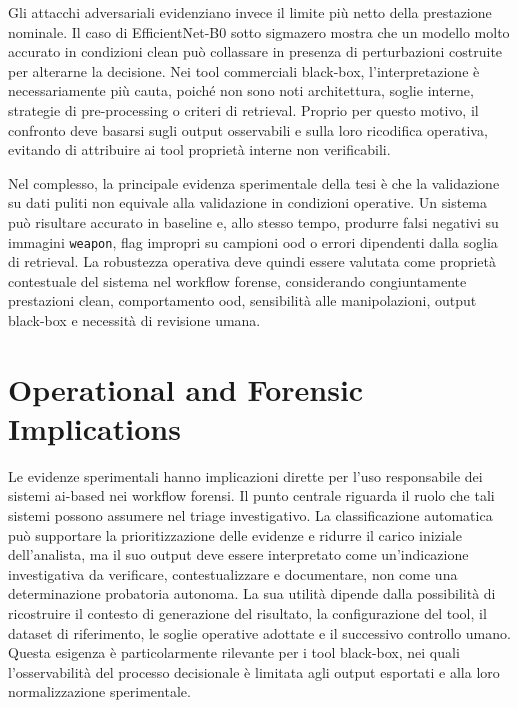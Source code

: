 Gli attacchi adversariali evidenziano invece il limite più netto della
prestazione nominale. Il caso di EfficientNet-B0 sotto \gls{sigmazero} mostra
che un modello molto accurato in condizioni clean può collassare in presenza di
perturbazioni costruite per alterarne la decisione. Nei tool commerciali
black-box, l'interpretazione è necessariamente più cauta, poiché non sono noti
architettura, soglie interne, strategie di pre-processing o criteri di retrieval.
Proprio per questo motivo, il confronto deve basarsi sugli output osservabili e
sulla loro ricodifica operativa, evitando di attribuire ai tool proprietà interne
non verificabili.

Nel complesso, la principale evidenza sperimentale della tesi è che la
validazione su dati puliti non equivale alla validazione in condizioni operative.
Un sistema può risultare accurato in baseline e, allo stesso tempo, produrre
falsi negativi su immagini \texttt{weapon}, flag impropri su campioni \gls{ood}
o errori dipendenti dalla soglia di retrieval. La robustezza operativa deve
quindi essere valutata come proprietà contestuale del sistema nel workflow
forense, considerando congiuntamente prestazioni clean, comportamento
\gls{ood}, sensibilità alle manipolazioni, output black-box e necessità di
revisione umana.



\section{Operational and Forensic Implications}
\label{sec:conclusions-operational-implications}

Le evidenze sperimentali hanno implicazioni dirette per l'uso responsabile dei
sistemi \gls{ai}-based nei workflow forensi. Il punto centrale riguarda il ruolo
che tali sistemi possono assumere nel triage investigativo. La classificazione
automatica può supportare la prioritizzazione delle evidenze e ridurre il carico
iniziale dell'analista, ma il suo output deve essere interpretato come
un'indicazione investigativa da verificare, contestualizzare e documentare, non
come una determinazione probatoria autonoma. La sua utilità dipende dalla
possibilità di ricostruire il contesto di generazione del risultato, la
configurazione del tool, il dataset di riferimento, le soglie operative adottate
e il successivo controllo umano. Questa esigenza è particolarmente rilevante per
i tool black-box, nei quali l'osservabilità del processo decisionale è limitata
agli output esportati e alla loro normalizzazione sperimentale.

